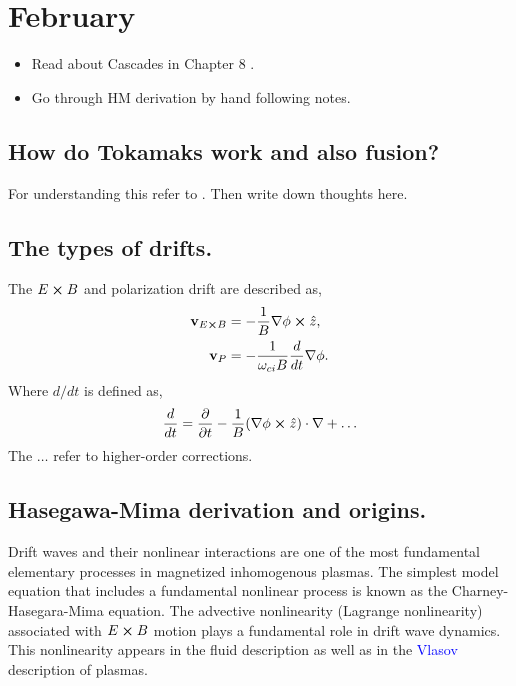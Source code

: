 \section{February}

\begin{itemize}
	\item Read about Cascades in Chapter 8 \cite{diamond_itoh_itoh_2010}.
	\item Go through HM derivation by hand following notes.  
\end{itemize}

\subsection{How do Tokamaks work and also fusion?}
For understanding this refer to \cite{dini2009overview}. Then write down thoughts here. 

\subsection{The types of drifts.}
The $E \cross B$ and polarization drift are described as, 
\begin{align}
	\bold{v}_{E \cross B} &= -\frac{1}{B} \nabla \phi \cross \hat{z}, \\
	\bold{v}_{P} &= - \frac{1}{\omega_{ci} B} \frac{d}{dt} \nabla \phi. 
\end{align}
Where $d/dt$ is defined as, 
\begin{align}
	\frac{d}{dt} = \frac{\partial}{\partial t} - \frac{1}{B} (\nabla \phi \cross \hat{z}) \cdot \nabla + \dots
\end{align}
The $\dots$ refer to higher-order corrections. 


\subsection{Hasegawa-Mima derivation and origins.}
Drift waves and their nonlinear interactions are one of the most fundamental elementary processes in magnetized inhomogenous plasmas. The simplest model equation that includes a fundamental nonlinear process is known as the Charney-Hasegara-Mima equation. The advective nonlinearity (Lagrange nonlinearity) associated with $E \cross B$ motion plays a fundamental role in drift wave dynamics. This nonlinearity appears in the fluid description as well as in the \textcolor{blue}{Vlasov} description of plasmas.

